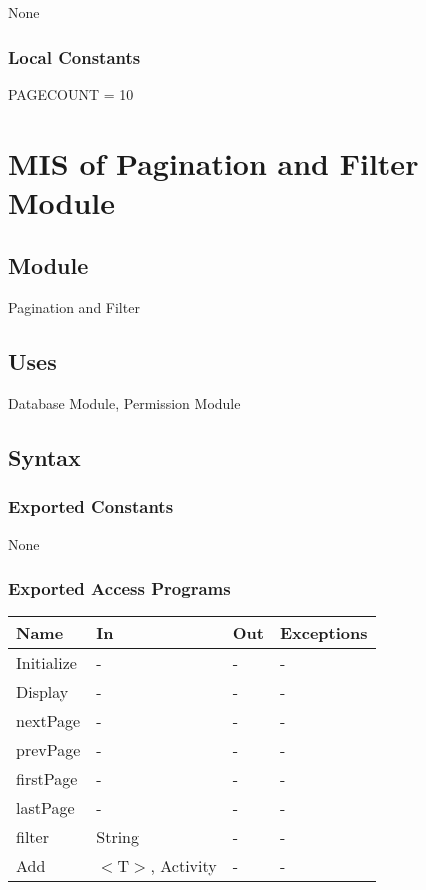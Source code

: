 \documentclass[12pt, titlepage]{article}
\begin{document}
None

\subsubsection{Local Constants}

PAGECOUNT = 10

\newpage

\section{MIS of Pagination and Filter Module} \label{mPF}

\subsection{Module}

Pagination and Filter

\subsection{Uses}

Database Module, Permission Module

\subsection{Syntax}

\subsubsection{Exported Constants}
None

\subsubsection{Exported Access Programs}
\begin{center}
\begin{tabular}{p{4cm} p{2cm} p{4cm} p{4cm}}
\hline
\textbf{Name} & \textbf{In} & \textbf{Out} & \textbf{Exceptions} \\
\hline
Initialize & - & - & -\\
Display & - & - & - \\
nextPage & - & - &  -\\
prevPage & - & - &  -\\
firstPage & - & - &  -\\
lastPage & - & - &  -\\
filter & String & - & -\\
Add & $<$T$>$, Activity & - & - \\
\hline
\end{tabular}
\end{center}
\end{document}
